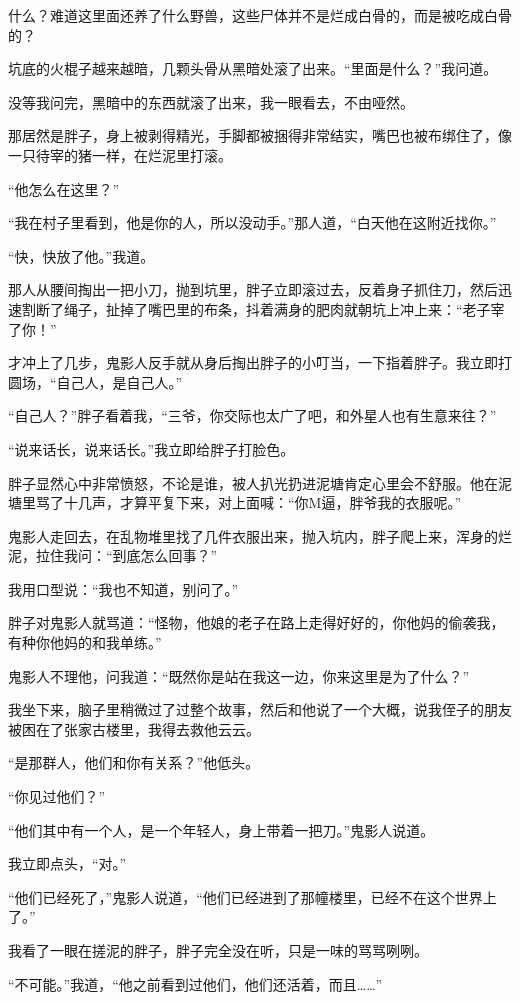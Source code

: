 什么？难道这里面还养了什么野兽，这些尸体并不是烂成白骨的，而是被吃成白骨的？

坑底的火棍子越来越暗，几颗头骨从黑暗处滚了出来。“里面是什么？”我问道。

没等我问完，黑暗中的东西就滚了出来，我一眼看去，不由哑然。

那居然是胖子，身上被剥得精光，手脚都被捆得非常结实，嘴巴也被布绑住了，像一只待宰的猪一样，在烂泥里打滚。

“他怎么在这里？”

“我在村子里看到，他是你的人，所以没动手。”那人道，“白天他在这附近找你。”

“快，快放了他。”我道。

那人从腰间掏出一把小刀，抛到坑里，胖子立即滚过去，反着身子抓住刀，然后迅速割断了绳子，扯掉了嘴巴里的布条，抖着满身的肥肉就朝坑上冲上来：“老子宰了你！”

才冲上了几步，鬼影人反手就从身后掏出胖子的小叮当，一下指着胖子。我立即打圆场，“自己人，是自己人。”

“自己人？”胖子看着我，“三爷，你交际也太广了吧，和外星人也有生意来往？”

“说来话长，说来话长。”我立即给胖子打脸色。

胖子显然心中非常愤怒，不论是谁，被人扒光扔进泥塘肯定心里会不舒服。他在泥塘里骂了十几声，才算平复下来，对上面喊：“你M逼，胖爷我的衣服呢。”

鬼影人走回去，在乱物堆里找了几件衣服出来，抛入坑内，胖子爬上来，浑身的烂泥，拉住我问：“到底怎么回事？”

我用口型说：“我也不知道，别问了。”

胖子对鬼影人就骂道：“怪物，他娘的老子在路上走得好好的，你他妈的偷袭我，有种你他妈的和我单练。”

鬼影人不理他，问我道：“既然你是站在我这一边，你来这里是为了什么？”

我坐下来，脑子里稍微过了过整个故事，然后和他说了一个大概，说我侄子的朋友被困在了张家古楼里，我得去救他云云。

“是那群人，他们和你有关系？”他低头。

“你见过他们？”

“他们其中有一个人，是一个年轻人，身上带着一把刀。”鬼影人说道。

我立即点头，“对。”

“他们已经死了，”鬼影人说道，“他们已经进到了那幢楼里，已经不在这个世界上了。”

我看了一眼在搓泥的胖子，胖子完全没在听，只是一味的骂骂咧咧。

“不可能。”我道，“他之前看到过他们，他们还活着，而且……”

